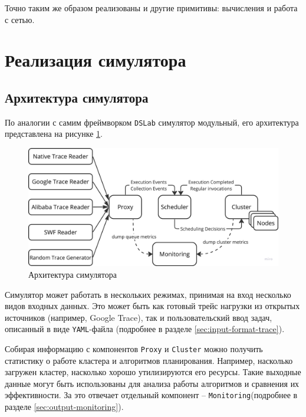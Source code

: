 Точно таким же образом реализованы и другие примитивы: вычисления и  работа с сетью. 


\section{Реализация симулятора}\label{sec:main-impl}


\subsection{Архитектура симулятора}

По аналогии с самим фреймворком \texttt{DSLab} симулятор модульный, его архитектура представлена на рисунке \ref{fig:arch}.

\begin{figure}[h!]
    \centering 
    \includegraphics[width=\textwidth]{images/simulator_arc}
    \caption{Архитектура симулятора}
    \label{fig:arch}
\end{figure}

Симулятор может работать в нескольких режимах, принимая на вход несколько видов входных данных. Это может быть как готовый трейс нагрузки из открытых источников (например, Google Trace), так и пользовательский ввод задач, описанный в виде \texttt{YAML}-файла (подробнее в разделе \ref{sec:input-format-trace}).

Собирая информацию с компонентов \texttt{Proxy} и \texttt{Cluster} можно получить статистику о работе кластера и алгоритмов планирования. Например, насколько загружен кластер, насколько хорошо утилизируются его ресурсы. Такие выходные данные могут быть использованы для анализа работы алгоритмов и сравнения их эффективности. За это отвечает отдельный компонент -- \texttt{Monitoring}(подробнее в разделе \ref{sec:output-monitoring}).


